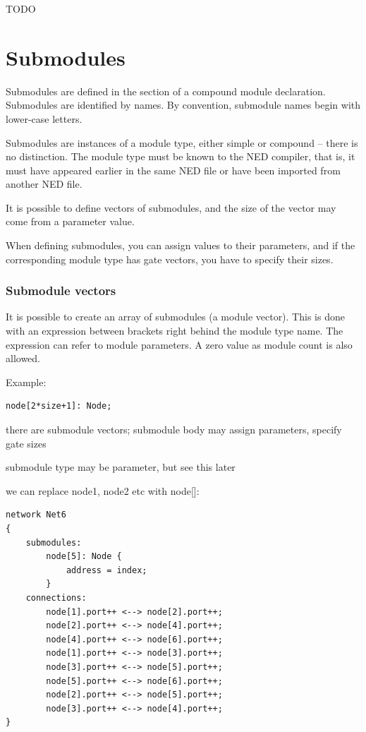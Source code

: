 TODO


\section{Submodules}

Submodules are defined in the
 section of a compound
module declaration. Submodules are identified by names.
By convention, submodule names begin with lower-case letters.

Submodules are instances of a module type, either simple
or compound -- there is no distinction. The module type
must be known to the NED compiler, that is, it must have appeared
earlier in the same NED file or have been imported from another
NED file.

It is possible to define vectors of submodules, and the
size of the vector may come from a parameter value.

When defining submodules, you can assign values to their
parameters, and if the corresponding module type has gate vectors,
you have to specify their sizes.


\subsubsection{Submodule vectors}

It is possible to create an array of
submodules (a module
vector).  This is done with an expression between
brackets right behind the module type name. The expression can refer
to module parameters. A zero value as module count is also allowed.

Example:

\begin{Verbatim}[commandchars=\\\{\}]
    node[2*size+1]: Node;
\end{Verbatim}

there are submodule vectors;
submodule body may assign parameters, specify gate sizes

submodule type may be parameter, but see this later

we can replace node1, node2 etc with node[]:

\begin{Verbatim}
network Net6
{
    submodules:
        node[5]: Node {
            address = index;
        }
    connections:
        node[1].port++ <--> node[2].port++;
        node[2].port++ <--> node[4].port++;
        node[4].port++ <--> node[6].port++;
        node[1].port++ <--> node[3].port++;
        node[3].port++ <--> node[5].port++;
        node[5].port++ <--> node[6].port++;
        node[2].port++ <--> node[5].port++;
        node[3].port++ <--> node[4].port++;
}
\end{Verbatim}


